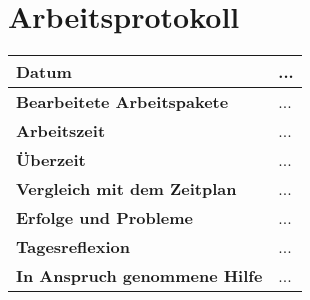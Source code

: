 \chapter{Arbeitsprotokoll}\label{ch:arbeitsprotokoll}
\renewcommand{\arraystretch}{1.5}
\begin{longtable}{p{}|p{}}
    \hline
    \textbf{Datum}                       & ...            \\
    \hline
    \textbf{Bearbeitete Arbeitspakete}   & ...                  \\
    \hline
    \textbf{Arbeitszeit}                 & ...                                    \\
    \hline
    \textbf{Überzeit}                    & ...                                    \\
    \hline
    \textbf{Vergleich mit dem Zeitplan}  & ... \\
    \hline
    \textbf{Erfolge und Probleme} & ...
    \\
    \hline
    \textbf{Tagesreflexion} & ...
    \\
    \hline
    \textbf{In Anspruch genommene Hilfe} & ...                              \\
    \hline
\end{longtable}\label{tab:arbeitsprotokoll-...}
\newpage
